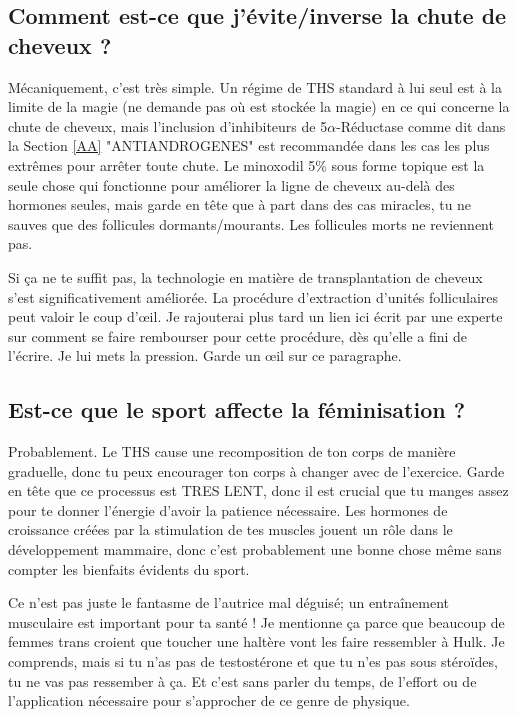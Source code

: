 \documentclass{article}
\begin{document}
\subsection{Comment est-ce que j'évite/inverse la chute de cheveux ?}\label{11-14}

Mécaniquement, c'est très simple. Un régime de THS standard à lui seul est à la limite de la magie (ne demande pas où est stockée la magie) en ce qui concerne la chute de cheveux, mais l'inclusion d'inhibiteurs de 5$\alpha$-Réductase comme dit dans la Section \ref{AA} "ANTIANDROGENES" est recommandée dans les cas les plus extrêmes pour arrêter toute chute. Le minoxodil 5\% sous forme topique est la seule chose qui fonctionne pour améliorer la ligne de cheveux au-delà des hormones seules, mais garde en tête que à part dans des cas miracles, tu ne sauves que des follicules dormants/mourants. Les follicules morts ne reviennent pas.

Si ça ne te suffit pas, la technologie en matière de transplantation de cheveux s'est significativement améliorée. La procédure d'extraction d'unités folliculaires peut valoir le coup d'œil. Je rajouterai plus tard un lien ici écrit par une experte sur comment se faire rembourser pour cette procédure, dès qu'elle a fini de l'écrire. Je lui mets la pression. Garde un œil sur ce paragraphe.

\subsection{Est-ce que le sport affecte la féminisation ?}

Probablement. Le THS cause une recomposition de ton corps de manière graduelle, donc tu peux encourager ton corps à changer avec de l'exercice. Garde en tête que ce processus est TRES LENT, donc il est crucial que tu manges assez pour te donner l'énergie d'avoir la patience nécessaire. Les hormones de croissance créées par la stimulation de tes muscles jouent un rôle dans le développement mammaire, donc c'est probablement une bonne chose même sans compter les bienfaits évidents du sport.

Ce n'est pas juste le fantasme de l'autrice mal déguisé; un entraînement musculaire est important pour ta santé ! Je mentionne ça parce que beaucoup de femmes trans croient que toucher une haltère vont les faire ressembler à Hulk. Je comprends, mais si tu n'as pas de testostérone et que tu n'es pas sous stéroïdes, tu ne vas pas ressember à ça. Et c'est sans parler du temps, de l'effort ou de l'application nécessaire pour s'approcher de ce genre de physique.
\end{document}

